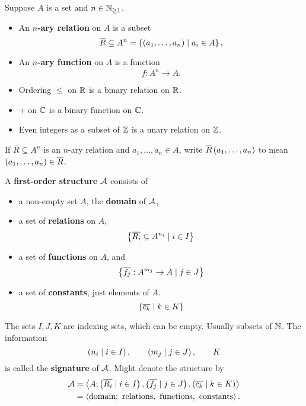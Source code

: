 \begin{definition}
Suppose $ A $ is a set and $ n \in \N_{\ge 1} $.
\begin{itemize}
\item An \textbf{$ n $-ary relation} on $ A $ is a subset
$$ \overline{R} \subseteq A^n = \cb{\rb{a_1, \dots, a_n} \mid a_i \in A}, $$
\item An \textbf{$ n $-ary function} on $ A $ is a function
$$ \overline{f} : A^n \to A. $$
\end{itemize}
\end{definition}

\begin{example*}
\hfill
\begin{itemize}
\item Ordering $ \le $ on $ \R $ is a binary relation on $ \R $.
\item $ + $ on $ \C $ is a binary function on $ \C $.
\item Even integers as a subset of $ \Z $ is a unary relation on $ \Z $.
\end{itemize}
\end{example*}

\begin{notation*}
If $ \overline{R} \subseteq A^n $ is an $ n $-ary relation and $ a_1, \dots, a_n \in A $, write $ \overline{R}\rb{a_1, \dots, a_n} $ to mean $ \rb{a_1, \dots, a_n} \in \overline{R} $.
\end{notation*}

\begin{definition}
A \textbf{first-order structure} $ \AA $ consists of
\begin{itemize}
\item a non-empty set $ A $, the \textbf{domain} of $ \AA $,
\item a set of \textbf{relations} on $ A $,
$$ \cb{\overline{R_i} \subseteq A^{n_i} \mid i \in I} $$
\item a set of \textbf{functions} on $ A $, and
$$ \cb{\overline{f_j} : A^{m_j} \to A \mid j \in J} $$
\item a set of \textbf{constants}, just elements of $ A $.
$$ \cb{\overline{c_k} \mid k \in K} $$
\end{itemize}
The sets $ I, J, K $ are indexing sets, which can be empty. Usually subsets of $ \N $. The information
$$ \rb{n_i \mid i \in I}, \qquad \rb{m_j \mid j \in J}, \qquad K $$
is called the \textbf{signature} of $ \AA $. Might denote the structure by
\begin{align*}
\AA
& = \ab{A; \rb{\overline{R_i} \mid i \in I}, \rb{\overline{f_j} \mid j \in J}, \rb{\overline{c_k} \mid k \in K}} \\
& = \ab{\text{domain}; \ \text{relations}, \ \text{functions}, \ \text{constants}}.
\end{align*}
\end{definition}

